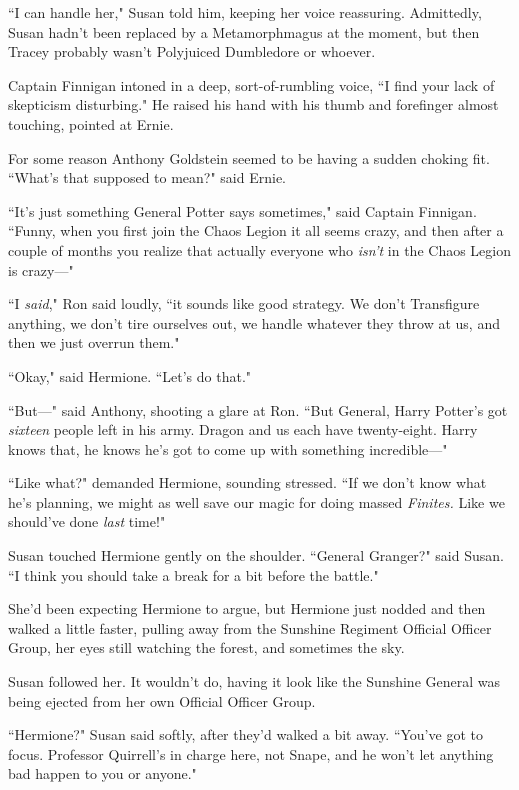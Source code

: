 ``I can handle her," Susan told him, keeping her voice reassuring. Admittedly, Susan hadn't been replaced by a Metamorphmagus at the moment, but then Tracey probably wasn't Polyjuiced Dumbledore or whoever.

Captain Finnigan intoned in a deep, sort-of-rumbling voice, ``I find your lack of skepticism disturbing." He raised his hand with his thumb and forefinger almost touching, pointed at Ernie.

For some reason Anthony Goldstein seemed to be having a sudden choking fit. ``What's that supposed to mean?" said Ernie.

``It's just something General Potter says sometimes," said Captain Finnigan. ``Funny, when you first join the Chaos Legion it all seems crazy, and then after a couple of months you realize that actually everyone who \emph{isn't} in the Chaos Legion is crazy—"

``I \emph{said}," Ron said loudly, ``it sounds like good strategy. We don't Transfigure anything, we don't tire ourselves out, we handle whatever they throw at us, and then we just overrun them."

``Okay," said Hermione. ``Let's do that."

``But—" said Anthony, shooting a glare at Ron. ``But General, Harry Potter's got \emph{sixteen} people left in his army. Dragon and us each have twenty-eight. Harry knows that, he knows he's got to come up with something incredible—"

``Like what?" demanded Hermione, sounding stressed. ``If we don't know what he's planning, we might as well save our magic for doing massed \emph{Finites.} Like we should've done \emph{last} time!"

Susan touched Hermione gently on the shoulder. ``General Granger?" said Susan. ``I think you should take a break for a bit before the battle."

She'd been expecting Hermione to argue, but Hermione just nodded and then walked a little faster, pulling away from the Sunshine Regiment Official Officer Group, her eyes still watching the forest, and sometimes the sky.

Susan followed her. It wouldn't do, having it look like the Sunshine General was being ejected from her own Official Officer Group.

``Hermione?" Susan said softly, after they'd walked a bit away. ``You've got to focus. Professor Quirrell's in charge here, not Snape, and he won't let anything bad happen to you or anyone."

